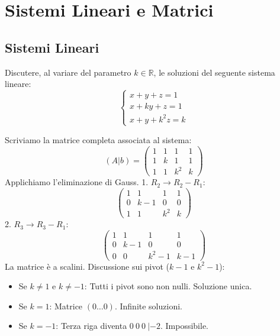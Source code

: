 \section{Sistemi Lineari e Matrici}

\subsection{Sistemi Lineari}

\begin{exercisebox}[title={Esercizio 1: Parametri}]
Discutere, al variare del parametro $k \in \mathbb{R}$, le soluzioni del seguente sistema lineare:
$$
\begin{cases}
x + y + z = 1 \\
x + k y + z = 1 \\
x + y + k^2 z = k
\end{cases}
$$
\end{exercisebox}

\begin{solbox}
Scriviamo la matrice completa associata al sistema:
$$
(A|b) = \left(\begin{array}{ccc|c}
1 & 1 & 1 & 1 \\
1 & k & 1 & 1 \\
1 & 1 & k^2 & k
\end{array}\right)
$$
Applichiamo l'eliminazione di Gauss.
1. $R_2 \to R_2 - R_1$:
$$ \left(\begin{array}{ccc|c} 1 & 1 & 1 & 1 \\ 0 & k-1 & 0 & 0 \\ 1 & 1 & k^2 & k \end{array}\right) $$
2. $R_3 \to R_3 - R_1$:
$$ \left(\begin{array}{ccc|c} 1 & 1 & 1 & 1 \\ 0 & k-1 & 0 & 0 \\ 0 & 0 & k^2-1 & k-1 \end{array}\right) $$
La matrice è a scalini.
Discussione sui pivot ($k-1$ e $k^2-1$):
\begin{itemize}
    \item Se $k \neq 1$ e $k \neq -1$: Tutti i pivot sono non nulli. Soluzione unica.
    \item Se $k = 1$: Matrice $(0 \dots 0)$. Infinite soluzioni.
    \item Se $k = -1$: Terza riga diventa $0 \ 0 \ 0 \ | -2$. Impossibile.
\end{itemize}
\end{solbox}

